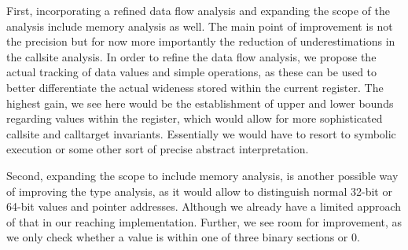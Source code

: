 First, incorporating a refined data flow analysis and 
expanding the scope of the analysis include memory analysis as well. The main point of improvement is not the precision but for now 
more importantly the reduction of underestimations in the callsite analysis.
In order to refine the data flow analysis, we propose the actual tracking of data values and simple operations, as these
can be used to better differentiate the actual wideness stored within the current register. The highest gain, 
we see here would be the establishment of upper and lower bounds regarding values within the register, which 
would allow for more sophisticated callsite and calltarget invariants. Essentially we would have to resort 
to symbolic execution or some other sort of precise abstract interpretation.

Second, expanding the scope to include memory analysis, is another possible way of improving the type analysis, as it 
would allow to distinguish normal 32-bit or 64-bit values and pointer addresses. Although we already have a 
limited approach of that in our reaching implementation. Further, we see room for improvement, as we only check
whether a value is within one of three binary sections or 0.


